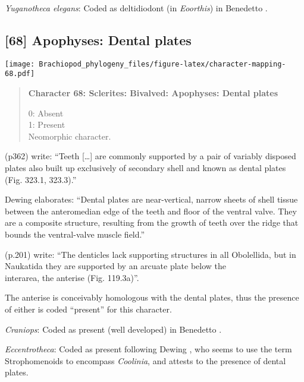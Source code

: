 \documentclass[openany]{book}
\theoremstyle{definition}
\theoremstyle{definition}
\theoremstyle{definition}
\theoremstyle{remark}
\begin{document}
\hypertarget{Yuganotheca_elegans-coding-67}{}
\emph{Yuganotheca elegans}: Coded as deltidiodont (in \emph{Eoorthis})
in Benedetto \citeyearpar{Benedetto2009iChaniella}.

\subsection*{{[}68{]} Apophyses: Dental
plates}\label{apophyses-dental-plates}

\texttt{[image: Brachiopod\_phylogeny\_files/figure-latex/character-mapping-68.pdf]}

\begin{quote}
\textbf{Character 68: Sclerites: Bivalved: Apophyses: Dental plates}

0: Absent\\
1: Present\\
Neomorphic character.
\end{quote}

\citet{Williams1997Introduction} (p362) write: ``Teeth {[}\ldots{}{]}
are commonly supported by a pair of variably disposed plates also built
up exclusively of secondary shell and known as dental plates (Fig.
323.1, 323.3).''

Dewing \citeyearpar{Dewing2001Hingemodifications} elaborates: ``Dental
plates are near-vertical, narrow sheets of shell tissue between the
anteromedian edge of the teeth and floor of the ventral valve. They are
a composite structure, resulting from the growth of teeth over the ridge
that bounds the ventral-valve muscle field.''

\citet{Williams2000LinguliformeaCraniiformea} (p.201) write: ``The
denticles lack supporting structures in all Obolellida, but in Naukatida
they are supported by an arcuate plate below the\\
interarea, the anterise (Fig. 119.3a)''.

The anterise is conceivably homologous with the dental plates, thus the
presence of either is coded ``present'' for this character.

\hypertarget{Craniops-coding-68}{}
\emph{Craniops}: Coded as present (well developed) in Benedetto
\citeyearpar{Benedetto2009iChaniella}.

\hypertarget{Eccentrotheca-coding-68}{}
\emph{Eccentrotheca}: Coded as present following Dewing
\citeyearpar{Dewing2001Hingemodifications}, who seems to use the term
Strophomenoids to encompass \emph{Coolinia}, and attests to the presence
of dental plates.
\end{document}
